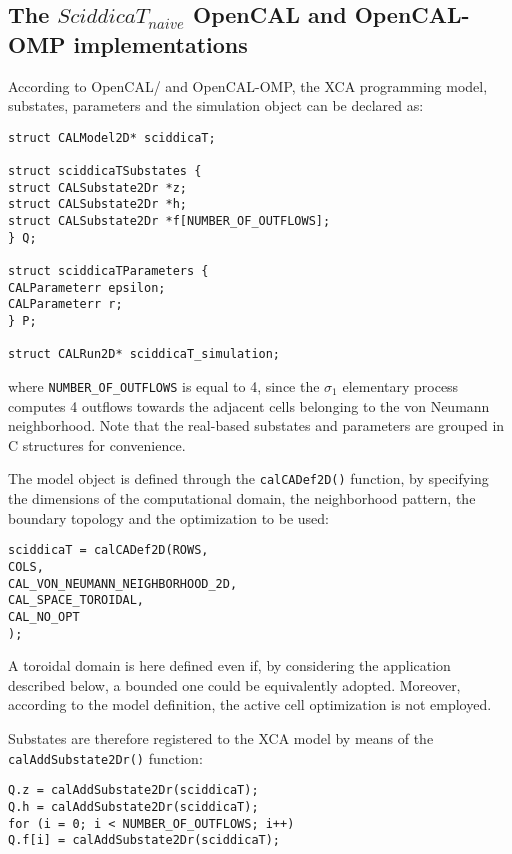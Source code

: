 \subsection{The $SciddicaT_{naive}$ OpenCAL and OpenCAL-OMP implementations}
According to OpenCAL/ and OpenCAL-OMP, the XCA programming model, substates,
parameters and the simulation object can be declared as:

\begin{lstlisting}[basicstyle=\footnotesize, numbers=none]
struct CALModel2D* sciddicaT;

struct sciddicaTSubstates {
struct CALSubstate2Dr *z;
struct CALSubstate2Dr *h;
struct CALSubstate2Dr *f[NUMBER_OF_OUTFLOWS];
} Q;

struct sciddicaTParameters {
CALParameterr epsilon;
CALParameterr r;
} P;

struct CALRun2D* sciddicaT_simulation;
\end{lstlisting}

\noindent where \verb'NUMBER_OF_OUTFLOWS' is equal to 4, since the
$\sigma_1$ elementary process computes 4 outflows towards the
adjacent cells belonging to the von Neumann neighborhood. Note that
the real-based substates and parameters are grouped in C structures
for convenience.

The model object is defined through the \verb'calCADef2D()'
function, by specifying the dimensions of the computational domain,
the neighborhood pattern, the boundary topology and the optimization
to be used:

\begin{lstlisting}[basicstyle=\footnotesize, numbers=none]
sciddicaT = calCADef2D(ROWS,
COLS,
CAL_VON_NEUMANN_NEIGHBORHOOD_2D,
CAL_SPACE_TOROIDAL,
CAL_NO_OPT
);
\end{lstlisting}

\noindent A toroidal domain is here defined even if, by considering
the application described below, a bounded one could be equivalently
adopted. Moreover, according to the model definition, the active
cell optimization is not employed.

Substates are therefore registered to the XCA model by means of the
\verb'calAddSubstate2Dr()' function:

\begin{lstlisting}[basicstyle=\footnotesize, numbers=none]
Q.z = calAddSubstate2Dr(sciddicaT);
Q.h = calAddSubstate2Dr(sciddicaT);
for (i = 0; i < NUMBER_OF_OUTFLOWS; i++)
Q.f[i] = calAddSubstate2Dr(sciddicaT);
\end{lstlisting}


